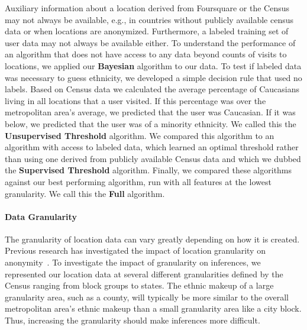 Auxiliary information about a location derived from Foursquare or the Census may not always be available, e.g., in countries without publicly available census data or when locations are anonymized. Furthermore, a labeled training set of user data may not always be available either. 
To understand the performance of an algorithm that does not have access to any data beyond counts of visits to locations, we applied our \textbf{Bayesian} algorithm to our data.
To test if labeled data was necessary to guess ethnicity, we developed a simple decision rule that used no labels. Based on Census data we calculated the average percentage of Caucasians living in all locations that a user visited. If this percentage was over the metropolitan area's average, we predicted that the user was Caucasian. If it was below, we predicted that the user was of a minority ethnicity.
We called this the \textbf{Unsupervised Threshold} algorithm.
We compared this algorithm to an algorithm with access to labeled data, which learned an optimal threshold rather than using one derived from publicly available Census data and which we dubbed the \textbf{Supervised Threshold} algorithm.
Finally, we compared these algorithms against our best performing algorithm, run with all features at the lowest granularity. We call this the \textbf{Full} algorithm.

\paragraph{Data Granularity}
The granularity of location data can vary greatly depending on how it is created. %
Previous research has investigated the impact of location granularity on anonymity~\cite{de2013unique, Zang:2011hk}. 
To investigate the impact of granularity on inferences, we represented our location data at several different granularities defined by the Census ranging from block groups to states.
The ethnic makeup of a large granularity area, such as a county, will typically be more similar to the overall metropolitan area's ethnic makeup than a small granularity area like a city block. Thus, increasing the granularity should make inferences more difficult.

